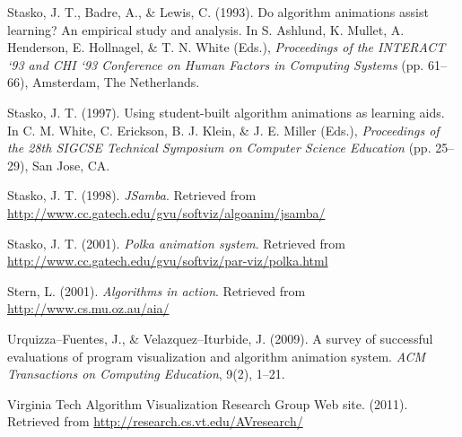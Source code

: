 \begin{chatext}
{Stasko, J. T., Badre, A., \& Lewis, C. (1993). Do algorithm animations assist learning? An empirical study and analysis. In S. Ashlund, K. Mullet, A. Henderson, E. Hollnagel, \& T. N. White (Eds.), \textit{Proceedings of the INTERACT ‘93 and CHI ‘93 Conference on Human Factors in Computing Systems} (pp. 61–66), Amsterdam, The Netherlands.

Stasko, J. T. (1997). Using student-built algorithm animations as learning aids. In C. M. White, C. Erickson, B. J. Klein, \& J. E. Miller (Eds.), \textit{Proceedings of the 28th SIGCSE Technical Symposium on Computer Science Education} (pp. 25–29), San Jose, CA.

Stasko, J. T. (1998). \textit{JSamba}. Retrieved from \url{http://www.cc.gatech.edu/gvu/softviz/algoanim/jsamba/}

Stasko, J. T. (2001). \textit{Polka animation system}. Retrieved from \url{http://www.cc.gatech.edu/gvu/softviz/par-viz/polka.html}

Stern, L. (2001). \textit{Algorithms in action}. Retrieved from \url{http://www.cs.mu.oz.au/aia/}

Urquizza–Fuentes, J., \& Velazquez–Iturbide, J. (2009). A survey of successful evaluations of program visualization and algorithm animation system. \textit{ACM Transactions on Computing Education}, 9(2), 1–21.

Virginia Tech Algorithm Visualization Research Group Web site. (2011). Retrieved from \url{http://research.cs.vt.edu/AVresearch/}

}

\end{chatext}
